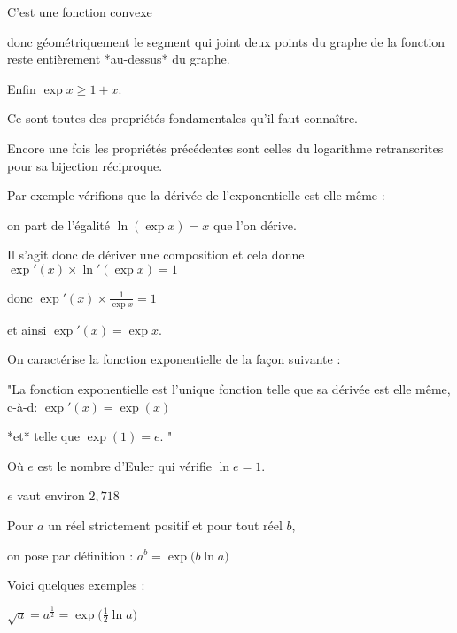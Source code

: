 \change

C'est une fonction convexe 


donc géométriquement le segment qui joint deux points du graphe de la fonction reste entièrement *au-dessus* du graphe.

Enfin $\exp x \ge 1+x$.

Ce sont toutes des propriétés fondamentales qu'il faut connaître.

\diapo

Encore une fois les propriétés précédentes sont celles du logarithme retranscrites pour sa bijection réciproque.

Par exemple vérifions  que la dérivée de l'exponentielle est elle-même :

\change

on part de l'égalité $\ln(\exp x)=x$ que l'on dérive.

\change

Il s'agit donc de dériver une composition et cela donne 
$\exp'(x) \times \ln'(\exp x) = 1$ 

\change

donc $\exp'(x) \times \frac{1}{\exp x} = 1$

\change

et ainsi $\exp'(x) = \exp x$.


\change

On caractérise la fonction exponentielle de la façon suivante :

"La fonction exponentielle est l'unique fonction
telle que sa dérivée est elle même, c-à-d: $\exp'(x) = \exp(x)$ 

*et* telle que $\exp(1) = e$. "

\change


Où $e$ est le nombre d'Euler qui vérifie $\ln e = 1$.

$e$ vaut environ $2,718$




\diapo

Pour $a$ un réel strictement positif et pour tout réel $b$,

on pose par définition :
$\displaystyle a^b = \exp\big(b \ln a\big)$


\change

Voici quelques exemples :

$\sqrt a = a^\frac12 = \exp\big( \frac12 \ln a\big)$


\change

